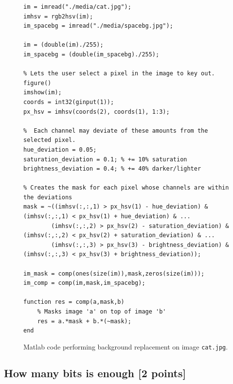 \documentclass[tikz,14pt,fleqn]{article}
\begin{document}
\begin{figure}[h!]
    \begin{verbatim} 
im = imread("./media/cat.jpg");
imhsv = rgb2hsv(im);
im_spacebg = imread("./media/spacebg.jpg");

im = (double(im)./255);
im_spacebg = (double(im_spacebg)./255);

% Lets the user select a pixel in the image to key out.
figure()
imshow(im);
coords = int32(ginput(1));
px_hsv = imhsv(coords(2), coords(1), 1:3);

%  Each channel may deviate of these amounts from the selected pixel.
hue_deviation = 0.05;
saturation_deviation = 0.1; % += 10% saturation
brightness_deviation = 0.4; % += 40% darker/lighter

% Creates the mask for each pixel whose channels are within the deviations
mask = ~((imhsv(:,:,1) > px_hsv(1) - hue_deviation) & (imhsv(:,:,1) < px_hsv(1) + hue_deviation) & ...
        (imhsv(:,:,2) > px_hsv(2) - saturation_deviation) & (imhsv(:,:,2) < px_hsv(2) + saturation_deviation) & ...
        (imhsv(:,:,3) > px_hsv(3) - brightness_deviation) & (imhsv(:,:,3) < px_hsv(3) + brightness_deviation));

im_mask = comp(ones(size(im)),mask,zeros(size(im)));
im_comp = comp(im,mask,im_spacebg);

function res = comp(a,mask,b)
    % Masks image 'a' on top of image 'b'
    res = a.*mask + b.*(~mask);
end
    \end{verbatim}
\caption{Matlab code performing background replacement on image \texttt{cat.jpg}.}
\end{figure}

\subsection{How many bits is enough [2 points]}
\end{document}
